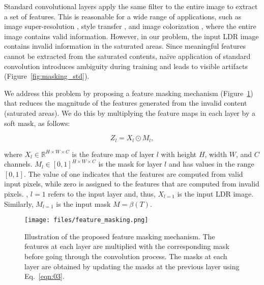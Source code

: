 Standard convolutional layers apply the same filter to the entire image to extract a set of features. This is reasonable for a wide range of applications, such as image super-resolution \cite{dong2015image}, style transfer \cite{gatys2016image}, and image colorization \cite{zhang2016colorful}, where the entire image contains valid information. However, in our problem, the input LDR image contains invalid information in the saturated areas. Since meaningful features cannot be extracted from the saturated contents, na\"ive application of standard convolution introduces ambiguity during training and leads to visible artifacts (Figure~\ref{fig:masking_std}).

We address this problem by proposing a feature masking mechanism (Figure~\ref{fig:feature_masking}) that reduces the magnitude of the features generated from the invalid content (saturated areas). We do this by multiplying the feature maps in each layer by a soft mask, as follows:

\vspace{-9pt}
\begin{equation}
\label{eqn:01}
  Z_{l} = X_{l} \odot M_{l},
\end{equation}
\vspace{-10pt}

\noindent where $ X_{l} \in \mathbb{R}^{H \times W \times C} $ is the feature map of layer $l$ with height $H$, width $W$, and $C$ channels. $ M_{l} \in [0,1]^{H \times W \times C} $ is the mask for layer $l$ and has values in the range $ [0, 1]$. The value of one indicates that the features are computed from valid input pixels, while zero is assigned to the features that are computed from invalid pixels. , $l = 1$ refers to the input layer and, thus, $X_{l=1}$ is the input LDR image. Similarly, $M_{l=1}$ is the input mask  $M = \beta(T)$.  

\begin{figure}
  \texttt{[image: files/feature\_masking.png]}
  \vspace{-0.20in}
  \caption{Illustration of the proposed feature masking mechanism. The features at each layer are multiplied with the corresponding mask before going through the convolution process. The masks at each layer are obtained by updating the masks at the previous layer using Eq.~\ref{eqn:03}.}
  \label{fig:feature_masking}
  \vspace{-0.15in}
\end{figure}

